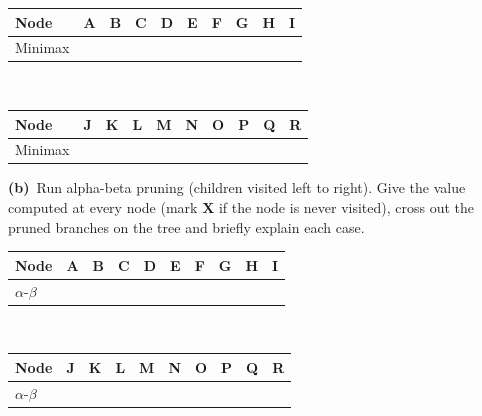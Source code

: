 \documentclass[11pt,a4paper]{article}
\newcommand{\subq}[1]{\par\smallskip\noindent\textbf{#1}\ }
\begin{document}
\begin{center}\small \begin{tabular}{|l|c|c|c|c|c|c|c|c|c|}\hline
\textbf{Node} & \textbf{A} & \textbf{B} & \textbf{C} & \textbf{D} & \textbf{E} & \textbf{F} & \textbf{G} & \textbf{H} & \textbf{I}\\ \hline
Minimax & \phantom{00} & \phantom{00} & \phantom{00} & \phantom{00} & \phantom{00} & \phantom{00} & \phantom{00} & \phantom{00} & \phantom{00}\\[1.5mm] \hline
\end{tabular}\\[2mm]\begin{tabular}{|l|c|c|c|c|c|c|c|c|c|}\hline
\textbf{Node} & \textbf{J} & \textbf{K} & \textbf{L} & \textbf{M} & \textbf{N} & \textbf{O} & \textbf{P} & \textbf{Q} & \textbf{R}\\ \hline
Minimax & \phantom{00} & \phantom{00} & \phantom{00} & \phantom{00} & \phantom{00} & \phantom{00} & \phantom{00} & \phantom{00} & \phantom{00}\\[1.5mm] \hline
\end{tabular}\end{center}\begin{ansbox}[height=0.8cm]\end{ansbox}
\subq{(b)}Run alpha-beta pruning (children visited left to right). Give the value computed at every node (mark \textbf{X} if the node is never visited), cross out the pruned branches on the tree and briefly explain each case.
\begin{center}\small \begin{tabular}{|l|c|c|c|c|c|c|c|c|c|}\hline
\textbf{Node} & \textbf{A} & \textbf{B} & \textbf{C} & \textbf{D} & \textbf{E} & \textbf{F} & \textbf{G} & \textbf{H} & \textbf{I}\\ \hline
$\alpha$-$\beta$ & \phantom{00} & \phantom{00} & \phantom{00} & \phantom{00} & \phantom{00} & \phantom{00} & \phantom{00} & \phantom{00} & \phantom{00}\\[1.5mm] \hline
\end{tabular}\\[2mm]\begin{tabular}{|l|c|c|c|c|c|c|c|c|c|}\hline
\textbf{Node} & \textbf{J} & \textbf{K} & \textbf{L} & \textbf{M} & \textbf{N} & \textbf{O} & \textbf{P} & \textbf{Q} & \textbf{R}\\ \hline
$\alpha$-$\beta$ & \phantom{00} & \phantom{00} & \phantom{00} & \phantom{00} & \phantom{00} & \phantom{00} & \phantom{00} & \phantom{00} & \phantom{00}\\[1.5mm] \hline
\end{tabular}\end{center}\begin{ansbox}[height=4.0cm]\end{ansbox}
\end{document}
